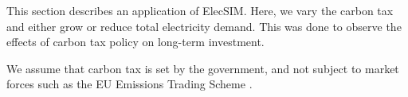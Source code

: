 
This section describes an application of ElecSIM. Here, we vary the carbon tax and either grow or reduce total electricity demand. This was done to observe the effects of carbon tax policy on long-term investment.

We assume that carbon tax is set by the government, and not subject to market forces such as the EU Emissions Trading Scheme \cite{Council2016}.



%
%
%
%
%
%
%










